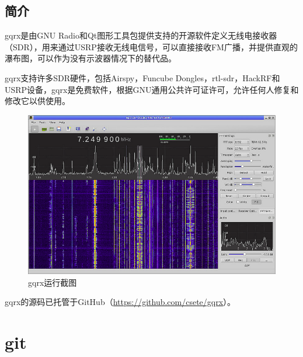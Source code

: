 		\subsection{简介}
			\par gqrx是由GNU Radio和Qt图形工具包提供支持的开源软件定义无线电接收器（SDR），用来通过USRP接收无线电信号，可以直接接收FM广播，并提供直观的瀑布图，可以作为没有示波器情况下的替代品。
			\par gqrx支持许多SDR硬件，包括Airspy，Funcube Dongles，rtl-sdr，HackRF和USRP设备，gqrx是免费软件，根据GNU通用公共许可证许可，允许任何人修复和修改它以供使用。
			\begin{figure}[htb]
				\centering
				\includegraphics[width=13cm]{figures/gqrx.png}
				\caption{gqrx运行截图}
				\label{fig:gqrx运行截图}
			\end{figure}
			\par gqrx的源码已托管于GitHub（\href{https://github.com/csete/gqrx}{https://github.com/csete/gqrx}）。
	\section{git}
